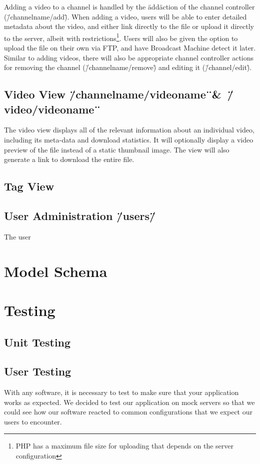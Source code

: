 \documentclass[a4paper,12pt]{report}
\begin{document}
Adding a video to a channel is handled by the \"add\" action of the channel controller (\"/channelname/add\").
When adding a video, users will be able to enter detailed metadata about the video, and either link directly to the file or upload it directly to the server, albeit with restrictions\footnote{PHP has a maximum file size for uploading that depends on the server configuration}.
Users will also be given the option to upload the file on their own via FTP, and have Broadcast Machine detect it later.
Similar to adding videos, there will also be appropriate channel controller actions for removing the channel (\"/channelname/remove\") and editing it (\"/channel/edit\").


\subsection{Video View \"/channelname/videoname\"\ \&\ \"/video/videoname\"\ }
The video view displays all of the relevant information about an individual video, including its meta-data and download statistics.
It will optionally display a video preview of the file instead of a static thumbnail image. The view will also generate a link to download the entire file.

\subsection{Tag View}

\subsection{User Administration \"/users/\"}
The user

\section{Model Schema}

\section{Testing}

\subsection{Unit Testing}

\subsection{User Testing}
With any software, it is necessary to test to make sure that your application works as expected.
We decided to test our application on mock servers so that we could see how our software reacted to common configurations that we expect our users to encounter.
\end{document}
